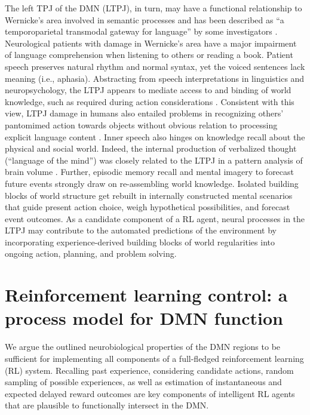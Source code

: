 \documentclass[10pt,letterpaper]{article}
\begin{document}
The left TPJ of the DMN (LTPJ),
in turn, may have a functional relationship to Wernicke's area
involved in semantic processes \citep{blumenfeld_book} and has
been described as ``a temporoparietal transmodal gateway for language''
by some investigators \citep{mesulam_book}.
Neurological patients with damage in Wernicke's area
have a major impairment of language comprehension
when listening to others or reading a book.
Patient speech
preserves natural rhythm and normal syntax, yet the
voiced sentences lack meaning (i.e., aphasia).
Abstracting from speech interpretations in linguistics
and neuropsychology,
the LTPJ appears to mediate access to and binding of world knowledge,
such as required during action considerations
\citep{binder2011neurobiology, seghier2013angular}.
Consistent with this view,
LTPJ damage in humans also entailed problems in recognizing
others' pantomimed action towards objects
without obvious relation to processing explicit language content
\citep{varney1987locus}.
%
Inner speech also hinges on knowledge recall
about the physical and social world.
Indeed,
the internal production of
verbalized thought (``language of the mind'') was closely related to the LTPJ
in a pattern analysis of brain volume
\citep{geva2011neural}.
Further,
episodic memory recall and mental imagery to forecast future events strongly draw on
re-assembling world knowledge.
Isolated building blocks of world structure get rebuilt
in internally constructed mental scenarios that
guide present action choice,
weigh hypothetical possibilities, and forecast event outcomes.
%
As a candidate component of a RL agent,
neural processes in the LTPJ may
contribute to the automated predictions of the environment
by incorporating experience-derived building blocks of world regularities
into ongoing action, planning, and problem solving.



\section{Reinforcement learning control: a process model for DMN function}
We argue the outlined neurobiological properties
of the DMN regions
to be sufficient for implementing all components
of a full-fledged reinforcement learning (RL) system.
Recalling past experience, considering candidate actions,
random sampling of possible experiences, as well as
estimation of instantaneous and expected delayed reward outcomes
are key components of intelligent RL agents
that are plausible to functionally intersect in the DMN.
\end{document}
